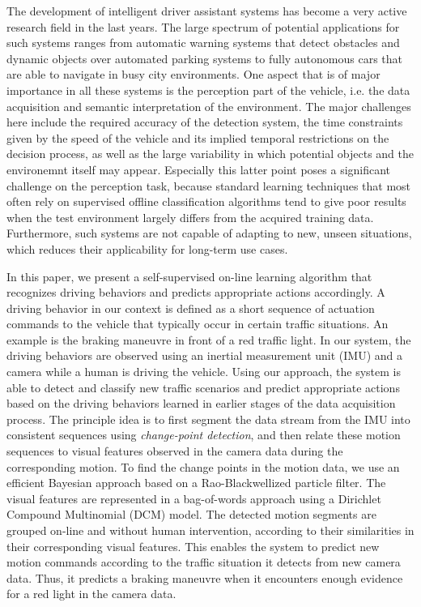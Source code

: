 The development of intelligent driver assistant systems has become a
very active research field in the last years. The large spectrum of
potential applications for such systems ranges from automatic warning
systems that detect obstacles and dynamic objects over automated
parking systems to fully autonomous cars that are able to navigate in
busy city environments. One aspect that is of major importance in all
these systems is the perception part of the vehicle, i.e. the data
acquisition and semantic interpretation of the environment. The major
challenges here include the required accuracy of the detection system,
the time constraints given by the speed of the vehicle and its implied
temporal restrictions on the decision process, as well as the large
variability in which potential objects and the environemnt itself may
appear. Especially this latter point poses a significant challenge on
the perception task, because standard learning techniques that most
often rely on supervised offline classification algorithms tend to
give poor results when the test environment largely differs from the
acquired training data. Furthermore, such systems are not capable of
adapting to new, unseen situations, which reduces their applicability
for long-term use cases. 

In this paper, we present a self-supervised on-line learning algorithm
that recognizes driving behaviors and predicts appropriate actions
accordingly. A driving behavior in our context is defined as a short
sequence of actuation commands to the vehicle that typically occur in
certain traffic situations. An example is the braking maneuvre in
front of a red traffic light. In our system, the driving behaviors are
observed using an inertial measurement unit (IMU) and a camera while a
human is driving the vehicle. Using our approach, the system is able
to detect and classify new traffic scenarios and predict appropriate
actions based on the driving behaviors learned in earlier stages of
the data acquisition process. The principle idea is to first segment
the data stream from the IMU into consistent sequences using
\emph{change-point detection}, and then relate these motion sequences
to visual features observed in the camera data during the
corresponding motion. To find the change points in the motion data, we
use an efficient Bayesian approach based on a Rao-Blackwellized
particle filter. The visual features are represented in a bag-of-words
approach using a Dirichlet Compound Multinomial (DCM) model. The
detected motion segments are grouped on-line and without human
intervention, according to their similarities in their corresponding
visual features. This enables the system to predict new motion
commands according to the traffic situation it detects from new camera
data. Thus, it predicts a braking maneuvre when it encounters enough
evidence for a red light in the camera data.


